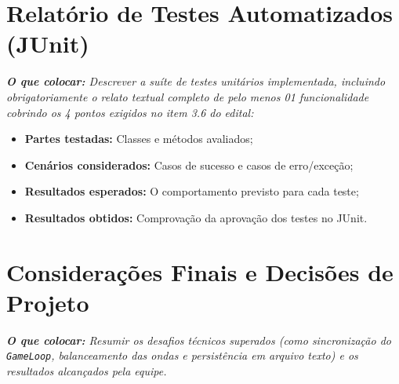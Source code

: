 \documentclass[11pt,a4paper]{article}
\begin{document}
\section{Relatório de Testes Automatizados (JUnit)}
\textit{\textbf{O que colocar:} Descrever a suíte de testes unitários implementada, incluindo obrigatoriamente o relato textual completo de pelo menos 01 funcionalidade cobrindo os 4 pontos exigidos no item 3.6 do edital:}
\begin{itemize}
    \item \textbf{Partes testadas:} Classes e métodos avaliados;
    \item \textbf{Cenários considerados:} Casos de sucesso e casos de erro/exceção;
    \item \textbf{Resultados esperados:} O comportamento previsto para cada teste;
    \item \textbf{Resultados obtidos:} Comprovação da aprovação dos testes no JUnit.
\end{itemize}

\section{Considerações Finais e Decisões de Projeto}
\textit{\textbf{O que colocar:} Resumir os desafios técnicos superados (como sincronização do \texttt{GameLoop}, balanceamento das ondas e persistência em arquivo texto) e os resultados alcançados pela equipe.}
\end{document}
